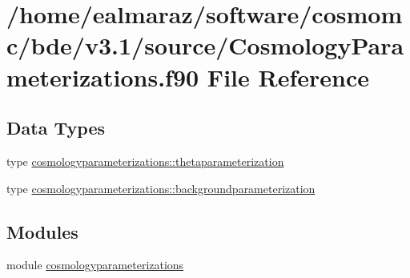 \hypertarget{CosmologyParameterizations_8f90}{}\section{/home/ealmaraz/software/cosmomc/bde/v3.1/source/\+Cosmology\+Parameterizations.f90 File Reference}
\label{CosmologyParameterizations_8f90}
\subsection*{Data Types}
\begin{DoxyCompactItemize}
\item 
type \mbox{\hyperlink{structcosmologyparameterizations_1_1thetaparameterization}{cosmologyparameterizations\+::thetaparameterization}}
\item 
type \mbox{\hyperlink{structcosmologyparameterizations_1_1backgroundparameterization}{cosmologyparameterizations\+::backgroundparameterization}}
\end{DoxyCompactItemize}
\subsection*{Modules}
\begin{DoxyCompactItemize}
\item 
module \mbox{\hyperlink{namespacecosmologyparameterizations}{cosmologyparameterizations}}
\end{DoxyCompactItemize}
